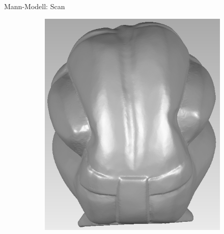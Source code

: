 \documentclass[11pt]{beamer}
\begin{document}
\begin{frame}{Mann-Modell: Scan}
\begin{figure}
\begin{subfigure}{0.4\textwidth}
			\includegraphics[width=\textwidth]{images/Mann_Back}
		\end{subfigure}
	\end{figure}
\end{frame}
\end{document}
